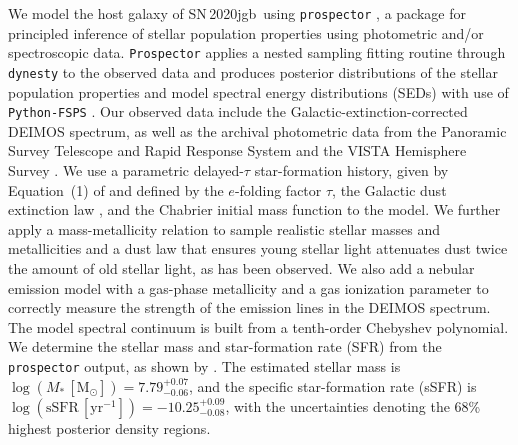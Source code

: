 \documentclass[twocolumn]{aastex631}
\newcommand{\sn}{SN\,2020jgb}
\newcommand{\Msun}{\mathrm{M_\odot}}
\begin{document}
We model the host galaxy of \sn\ using \texttt{prospector} \citep{Johnson_prospector_2021}, a package for principled inference of stellar population properties using photometric and/or spectroscopic data. \texttt{Prospector} applies a nested sampling fitting routine through \texttt{dynesty} \citep{Speagle_dynesty_2020} to the observed data and produces posterior distributions of the stellar population properties and model spectral energy distributions (SEDs) with use of \texttt{Python-FSPS} \citep{Conroy_2009,Conroy_2010}. Our observed data include the Galactic-extinction-corrected DEIMOS spectrum, as well as the archival photometric data from the Panoramic Survey Telescope and Rapid Response System \citep[Pan-STARRS;][$g$, $r$, $i$, $z$, $y$ Kron magnitudes]{PS1_2016}  and the VISTA Hemisphere Survey \citep[VHS;][$J$ and $K_s$ Petrosian magnitudes]{VHS_2013}. We use a parametric delayed-$\tau$ star-formation history, given by Equation~(1) of \citet{Nugent_2020} and defined by the $e$-folding factor $\tau$, the Galactic dust extinction law \citep{Cardelli_1989}, and the Chabrier initial mass function \citep{Chabrier_2003} to the model. We further apply a mass-metallicity relation \citep{Gallazzi_2005} to sample realistic stellar masses and metallicities and a dust law that ensures young stellar light attenuates dust twice the amount of old stellar light, as has been observed.  We also add a nebular emission model \citep{Byler_2017} with a gas-phase metallicity and a gas ionization parameter to correctly measure the strength of the emission lines in the DEIMOS spectrum. The model spectral continuum is built from a tenth-order Chebyshev polynomial. We determine the stellar mass and star-formation rate (SFR) from the \texttt{prospector} output, as shown by \citet{Nugent_2022}. The estimated stellar mass is $\log (M_*\,[\Msun])=7.79_{-0.06}^{+0.07}$, and the specific star-formation rate (sSFR) is $\log (\mathrm{sSFR}\,[\mathrm{yr}^{-1}])=-10.25_{-0.08}^{+0.09}$, with the uncertainties denoting the 68\% highest posterior density regions.
\end{document}
